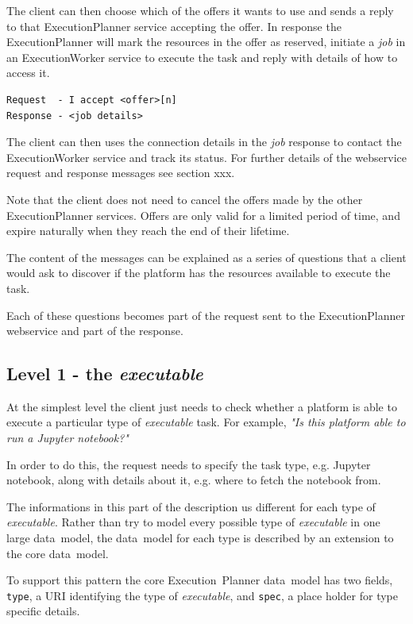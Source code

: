 \documentclass[11pt,a4paper]{ivoa}
\newcommand{\datamodel} {data~model}
\newcommand{\webservice} {webservice}
\newcommand{\execplanner} {ExecutionPlanner}
\newcommand{\execworker} {ExecutionWorker}
\newcommand{\executionplanner} {Execution~Planner}
\newcommand{\jupyternotebook} {Jupyter notebook}
\newcommand{\codeword}[1] {\texttt{#1}}
\newcommand{\executable} {\textit{executable}}
\newcommand{\excutabletask} {\textit{executable} task}
\newcommand{\workerjob} {\textit{job}}
\begin{document}
The client can then choose which of the offers it wants to use and sends a reply
to that \execplanner{} service accepting the offer.
In response the \execplanner{} will mark the resources in the offer as reserved,
initiate a \workerjob{} in an \execworker{} service to execute the task
and reply with details of how to access it.

\begin{lstlisting}[]
Request  - I accept <offer>[n]
Response - <job details>
\end{lstlisting}

The client can then uses the connection details in the \workerjob{} response to contact
the \execworker{} service and track its status.
For further details of the \webservice{} request and response messages see section xxx.

Note that the client does not need to cancel the offers made by the other \execplanner{} services.
Offers are only valid for a limited period of time, and expire naturally when they reach the end
of their lifetime.

The content of the messages can be explained as a series of questions that
a client would ask to discover if the platform has the resources available
to execute the task.

Each of these questions becomes part of the request sent to the \execplanner{}
\webservice{} and part of the response.

\subsection{Level 1 - the \executable{}}
\label{executable}

At the simplest level the client just needs to check whether a platform is able to execute a particular
type of \excutabletask{}.
For example, \textit{"Is this platform able to run a \jupyternotebook{}?"}

In order to do this, the request needs to specify the task type, e.g. \jupyternotebook{},
along with details about it, e.g. where to fetch the notebook from.

The informations in this part of the description us different for each type of \executable{}.
Rather than try to model every possible type of \executable{} in one large \datamodel{},
the \datamodel{} for each type is described by an extension to the core \datamodel{}.

To support this pattern the core \executionplanner{} \datamodel{} has two fields, \codeword{type},
a URI identifying the type of \executable{}, and \codeword{spec}, a place holder for
type specific details.
\end{document}
